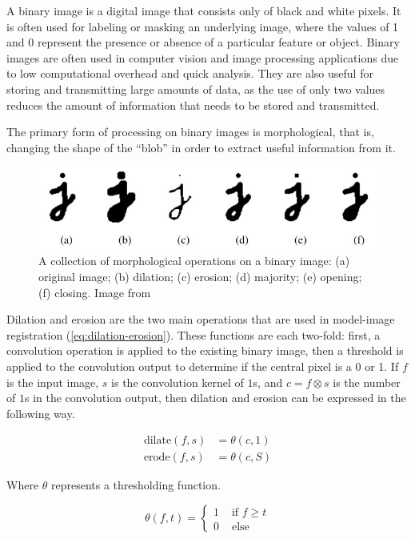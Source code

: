 A binary image is a digital image that consists only of black and white pixels. It is often used for labeling or masking an underlying image, where the values of 1 and 0 represent the presence or absence of a particular feature or object. Binary images are often used in computer vision and image processing applications due to low computational overhead and quick analysis. They are also useful for storing and transmitting large amounts of data, as the use of only two values reduces the amount of information that needs to be stored and transmitted.

The primary form of processing on binary images is morphological, that is, changing the shape of the ``blob'' in order to extract useful information from it.

\begin{figure}[h!]
    \includegraphics[width = \linewidth]{figs/background/png/binary-image-processing.jpg}
    \caption{A collection of morphological operations on a binary image: (a) original image; (b) dilation; (c) erosion; (d) majority; (e) opening; (f) closing. Image from \cite{szeliskiComputerVisionAlgorithms2022}}
    \label{fig:binary-image-processing}
\end{figure}

Dilation and erosion are the two main operations that are used in model-image registration (\ref{eq:dilation-erosion}). These functions are each two-fold: first, a convolution operation is applied to the existing binary image, then a threshold is applied to the convolution output to determine if the central pixel is a 0 or 1. If $f$ is the input image, $s$ is the convolution kernel of $1$s, and $c=f\otimes s$ is the number of $1$s in the convolution output, then dilation and erosion can be expressed in the following way.

\begin{equation}
    \begin{aligned}
        \text{dilate}(f,s) &= \theta(c,1) \\
        \text{erode}(f,s) &= \theta(c,S) 
    \end{aligned}
    \label{eq:dilation-erosion}
\end{equation}

Where $\theta$ represents a thresholding function.

\begin{equation}
    \theta (f,t) = \begin{cases}
        1 &\text{ if } f\ge t \\
        0 &\text{ else}
    \end{cases}
\end{equation}

